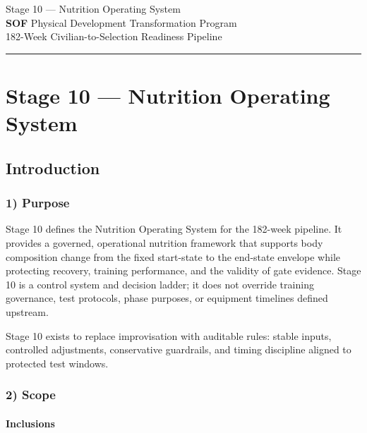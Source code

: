 \documentclass[10pt]{article}
\newcommand{\TitleLine}{\textcolor{StageBlue}{\rule{0.98\linewidth}{0.95pt}}}
\begin{document}
\begin{tcolorbox}
\begin{center}
Stage 10 — Nutrition Operating System\\[0.35em]
\textbf{SOF} Physical Development Transformation Program\\[0.25em]
182-Week Civilian-to-Selection Readiness Pipeline\\[0.65em]
\TitleLine
\end{center}
\end{tcolorbox}

\vspace{0.35em}

\section*{Stage 10 — Nutrition Operating System}
{}

\subsection*{Introduction}
{}

\subsubsection*{1) Purpose}

Stage 10 defines the Nutrition Operating System for the 182-week pipeline. It provides a governed, operational nutrition framework that supports body composition change from the fixed start-state to the end-state envelope while protecting recovery, training performance, and the validity of gate evidence. Stage 10 is a control system and decision ladder; it does not override training governance, test protocols, phase purposes, or equipment timelines defined upstream.

Stage 10 exists to replace improvisation with auditable rules: stable inputs, controlled adjustments, conservative guardrails, and timing discipline aligned to protected test windows.

\subsubsection*{2) Scope}

\paragraph*{Inclusions}
\end{document}
